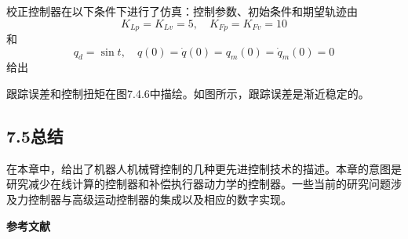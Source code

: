 \documentclass[UTF8]{ctexart}
\begin{document}
校正控制器在以下条件下进行了仿真：控制参数、初始条件和期望轨迹由
\begin{equation*}
K_{Lp} = K_{Lv} = 5, \quad K_{Fp} = K_{Fv} = 10
\end{equation*}
和
\begin{equation*}
q_d = \sin t, \quad q(0) = \dot{q}(0) = q_m(0) = \dot{q}_m(0) = 0
\end{equation*}
给出

跟踪误差和控制扭矩在图7.4.6中描绘。如图所示，跟踪误差是渐近稳定的。

\subsection*{7.5\quad 总结}

在本章中，给出了机器人机械臂控制的几种更先进控制技术的描述。本章的意图是研究减少在线计算的控制器和补偿执行器动力学的控制器。一些当前的研究问题涉及力控制器与高级运动控制器的集成以及相应的数字实现。

\vspace{1cm}
\noindent\textbf{参考文献}
\end{document}
